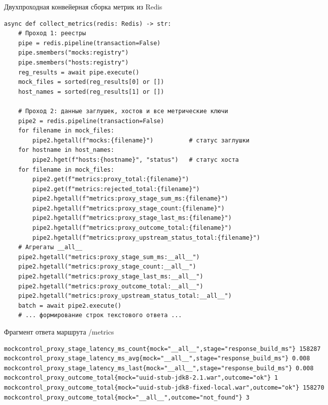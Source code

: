 \clearpage
\begin{listing}[H]
\caption{Двухпроходная конвейерная сборка метрик из Redis}
\label{lst:collect-metrics}
\begin{mdframed}
\begin{verbatim}
async def collect_metrics(redis: Redis) -> str:
    # Проход 1: реестры
    pipe = redis.pipeline(transaction=False)
    pipe.smembers("mocks:registry")
    pipe.smembers("hosts:registry")
    reg_results = await pipe.execute()
    mock_files = sorted(reg_results[0] or [])
    host_names = sorted(reg_results[1] or [])

    # Проход 2: данные заглушек, хостов и все метрические ключи
    pipe2 = redis.pipeline(transaction=False)
    for filename in mock_files:
        pipe2.hgetall(f"mocks:{filename}")          # статус заглушки
    for hostname in host_names:
        pipe2.hget(f"hosts:{hostname}", "status")   # статус хоста
    for filename in mock_files:
        pipe2.get(f"metrics:proxy_total:{filename}")
        pipe2.get(f"metrics:rejected_total:{filename}")
        pipe2.hgetall(f"metrics:proxy_stage_sum_ms:{filename}")
        pipe2.hgetall(f"metrics:proxy_stage_count:{filename}")
        pipe2.hgetall(f"metrics:proxy_stage_last_ms:{filename}")
        pipe2.hgetall(f"metrics:proxy_outcome_total:{filename}")
        pipe2.hgetall(f"metrics:proxy_upstream_status_total:{filename}")
    # Агрегаты __all__
    pipe2.hgetall("metrics:proxy_stage_sum_ms:__all__")
    pipe2.hgetall("metrics:proxy_stage_count:__all__")
    pipe2.hgetall("metrics:proxy_stage_last_ms:__all__")
    pipe2.hgetall("metrics:proxy_outcome_total:__all__")
    pipe2.hgetall("metrics:proxy_upstream_status_total:__all__")
    batch = await pipe2.execute()
    # ... формирование строк текстового ответа ...
\end{verbatim}
\end{mdframed}
\end{listing}

\clearpage
\begin{listing}[H]
\caption{Фрагмент ответа маршрута /metrics}
\label{lst:metrics-output}
\begin{mdframed}
\begin{verbatim}
mockcontrol_proxy_stage_latency_ms_count{mock="__all__",stage="response_build_ms"} 158287
mockcontrol_proxy_stage_latency_ms_avg{mock="__all__",stage="response_build_ms"} 0.008
mockcontrol_proxy_stage_latency_ms_last{mock="__all__",stage="response_build_ms"} 0.008
mockcontrol_proxy_outcome_total{mock="uuid-stub-jdk8-2.1.war",outcome="ok"} 1
mockcontrol_proxy_outcome_total{mock="uuid-stub-jdk8-fixed-local.war",outcome="ok"} 158270
mockcontrol_proxy_outcome_total{mock="__all__",outcome="not_found"} 3
\end{verbatim}
\end{mdframed}
\end{listing}

